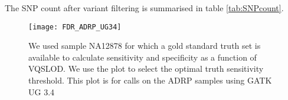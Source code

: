 The SNP count after variant filtering is summarised in table \ref{tab:SNPcount}.

\begin{figure}[!htbp]
\centering
\texttt{[image: FDR\_ADRP\_UG34]}
\caption{We used sample NA12878 for which a gold standard truth set is available to calculate sensitivity and specificity as a function of VQSLOD. We use the plot to select the optimal truth sensitivity threshold. This plot is for calls on the ADRP samples using GATK \gls{UG} 3.4}
\label{fig:ROC1}
\end{figure}